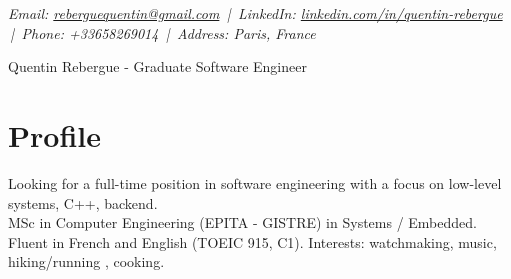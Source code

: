 \documentclass[9pt,a4paper]{article}
\newcommand{\namefont}{\fontsize{18}{22}\selectfont}
\newcommand{\tinyscript}{\fontsize{8}{8}\selectfont}
\begin{document}
\renewcommand\normalsize{\fontsize{10.5}{15}\selectfont}
\normalsize

\begin{center}
  {\tinyscript\itshape
  Email: \href{mailto:reberguequentin@gmail.com}{reberguequentin@gmail.com} \,|\,
  LinkedIn: \href{https://linkedin.com/in/quentin-rebergue}{linkedin.com/in/quentin-rebergue} \,|\,
  Phone: +33658269014 \,|\,
  Address: Paris, France}
\end{center}

\begin{center}
  {\namefont Quentin Rebergue - Graduate Software Engineer}
\end{center}

\section*{Profile}
\begin{tcolorbox}[mybox2]
Looking for a full-time position in software engineering with a focus on low-level systems, C++, backend.\\[0.3em]
MSc in Computer Engineering (EPITA - GISTRE) in Systems / Embedded.\\[0.3em]
Fluent in French and English (TOEIC 915, C1). Interests: watchmaking, music, hiking/running , cooking.
\end{tcolorbox}
\end{document}
